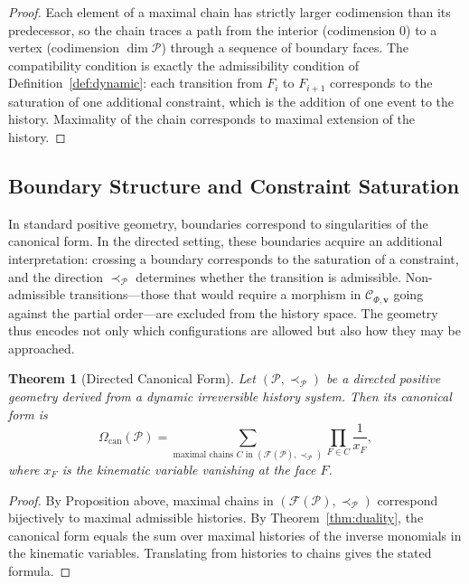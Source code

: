 \documentclass[12pt, oneside]{amsart}
\theoremstyle{plain}
\newtheorem{theorem}{Theorem}[section]
\theoremstyle{definition}
\theoremstyle{remark}
\newcommand{\CF}{\Omega_{\mathrm{can}}}
\newcommand{\Ccat}{\mathcal{C}_{\Phi,\mathbf{v}}}
\begin{document}
\begin{proof}
Each element of a maximal chain has strictly larger codimension than its predecessor, so the chain traces a path from the interior (codimension 0) to a vertex (codimension $\dim\mathcal{P}$) through a sequence of boundary faces. The compatibility condition is exactly the admissibility condition of Definition~\ref{def:dynamic}: each transition from $F_i$ to $F_{i+1}$ corresponds to the saturation of one additional constraint, which is the addition of one event to the history. Maximality of the chain corresponds to maximal extension of the history.
\end{proof}

\subsection{Boundary Structure and Constraint Saturation}

In standard positive geometry, boundaries correspond to singularities of the canonical form. In the directed setting, these boundaries acquire an additional interpretation: crossing a boundary corresponds to the saturation of a constraint, and the direction $\prec_{\mathcal{P}}$ determines whether the transition is admissible. Non-admissible transitions---those that would require a morphism in $\Ccat$ going against the partial order---are excluded from the history space. The geometry thus encodes not only which configurations are allowed but also how they may be approached.

\begin{theorem}[Directed Canonical Form]
\label{thm:directed-form}
Let $(\mathcal{P}, \prec_{\mathcal{P}})$ be a directed positive geometry derived from a dynamic irreversible history system. Then its canonical form is
\[
  \CF(\mathcal{P}) = \sum_{\text{maximal chains } C \text{ in } (\mathcal{F}(\mathcal{P}), \prec_{\mathcal{P}})} \prod_{F \in C} \frac{1}{x_F},
\]
where $x_F$ is the kinematic variable vanishing at the face $F$.
\end{theorem}

\begin{proof}
By Proposition above, maximal chains in $(\mathcal{F}(\mathcal{P}), \prec_{\mathcal{P}})$ correspond bijectively to maximal admissible histories. By Theorem~\ref{thm:duality}, the canonical form equals the sum over maximal histories of the inverse monomials in the kinematic variables. Translating from histories to chains gives the stated formula.
\end{proof}
\end{document}
